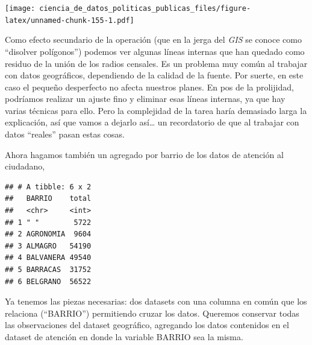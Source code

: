 \documentclass[]{book}
\newenvironment{Shaded}{\begin{snugshade}}{\end{snugshade}}
\newcommand{\KeywordTok}[1]{\textcolor[rgb]{0.13,0.29,0.53}{\textbf{#1}}}
\newcommand{\DataTypeTok}[1]{\textcolor[rgb]{0.13,0.29,0.53}{#1}}
\newcommand{\StringTok}[1]{\textcolor[rgb]{0.31,0.60,0.02}{#1}}
\newcommand{\OperatorTok}[1]{\textcolor[rgb]{0.81,0.36,0.00}{\textbf{#1}}}
\newcommand{\NormalTok}[1]{#1}
\begin{document}
\texttt{[image: ciencia\_de\_datos\_politicas\_publicas\_files/figure-latex/unnamed-chunk-155-1.pdf]}

Como efecto secundario de la operación (que en la jerga del \emph{GIS}
se conoce como ``disolver polígonos'') podemos ver algunas líneas
internas que han quedado como residuo de la unión de los radios
censales. Es un problema muy común al trabajar con datos geográficos,
dependiendo de la calidad de la fuente. Por suerte, en este caso el
pequeño desperfecto no afecta nuestros planes. En pos de la prolijidad,
podríamos realizar un ajuste fino y eliminar esas líneas internas, ya
que hay varias técnicas para ello. Pero la complejidad de la tarea haría
demasiado larga la explicación, así que vamos a dejarlo así\ldots{} un
recordatorio de que al trabajar con datos ``reales'' pasan estas cosas.

Ahora hagamos también un agregado por barrio de los datos de atención al
ciudadano,

\begin{Shaded}
\end{Shaded}

\begin{verbatim}
## # A tibble: 6 x 2
##   BARRIO    total
##   <chr>     <int>
## 1 " "        5722
## 2 AGRONOMIA  9604
## 3 ALMAGRO   54190
## 4 BALVANERA 49540
## 5 BARRACAS  31752
## 6 BELGRANO  56522
\end{verbatim}

Ya tenemos las piezas necesarias: dos datasets con una columna en común
que los relaciona (``BARRIO'') permitiendo cruzar los datos. Queremos
conservar todas las observaciones del dataset geográfico, agregando los
datos contenidos en el dataset de atención en donde la variable BARRIO
sea la misma.

\begin{Shaded}
\end{Shaded}
\end{document}
